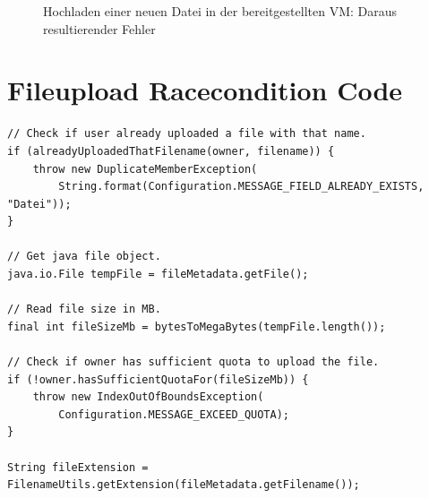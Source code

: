 \documentclass[12pt,DIV14,BCOR10mm,a4paper,parskip=half-,headsepline,headinclude,english,ngerman,bibliography=totocnumbered]{scrreprt}
\begin{document}
\begin{appendices}
\begin{figure}[!htb]
  \centering
    \label{upload_fail_1}
    \caption{Hochladen einer neuen Datei in der bereitgestellten VM: Daraus resultierender Fehler}
  \end{figure}

\chapter{Fileupload Racecondition Code}
 \label{fileuploadcode}
\begin{lstlisting}
// Check if user already uploaded a file with that name.
if (alreadyUploadedThatFilename(owner, filename)) {
    throw new DuplicateMemberException(
        String.format(Configuration.MESSAGE_FIELD_ALREADY_EXISTS, "Datei"));
}

// Get java file object.
java.io.File tempFile = fileMetadata.getFile();

// Read file size in MB.
final int fileSizeMb = bytesToMegaBytes(tempFile.length());

// Check if owner has sufficient quota to upload the file.
if (!owner.hasSufficientQuotaFor(fileSizeMb)) {
    throw new IndexOutOfBoundsException(
        Configuration.MESSAGE_EXCEED_QUOTA);
}

String fileExtension = FilenameUtils.getExtension(fileMetadata.getFilename());


\end{lstlisting}
\end{appendices}
\end{document}
